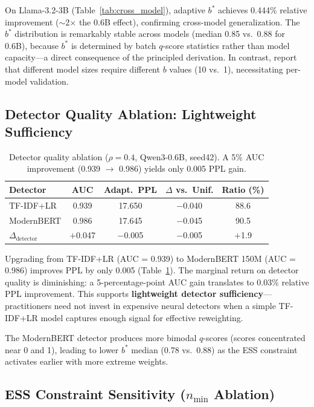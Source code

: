 \documentclass[11pt,a4paper]{article}
\newcommand{\bstar}{b^{*}}
\newcommand{\nmin}{n_{\min}}
\begin{document}
On Llama-3.2-3B (Table~\ref{tab:cross_model}), adaptive $\bstar$ achieves 0.444\% relative improvement ($\sim$2$\times$ the 0.6B effect), confirming cross-model generalization.
The $\bstar$ distribution is remarkably stable across models (median 0.85 vs.\ 0.88 for 0.6B), because $\bstar$ is determined by batch $q$-score statistics rather than model capacity---a direct consequence of the principled derivation.
In contrast, \citet{drayson2025} report that different model sizes require different $b$ values (10 vs.\ 1), necessitating per-model validation.

\subsection{Detector Quality Ablation: Lightweight Sufficiency}
\label{sec:detector_ablation}

\begin{table}[t]
\centering
\small
\caption{Detector quality ablation ($\rho{=}0.4$, Qwen3-0.6B, seed42). A 5\% AUC improvement (0.939 $\to$ 0.986) yields only 0.005 PPL gain.}
\label{tab:detector_ablation}
\begin{tabular}{lcccc}
\toprule
Detector & AUC & Adapt.\ PPL & $\Delta$ vs.\ Unif. & Ratio (\%) \\
\midrule
TF-IDF+LR & 0.939 & 17.650 & $-$0.040 & 88.6 \\
ModernBERT & 0.986 & 17.645 & $-$0.045 & 90.5 \\
\midrule
$\Delta_{\text{detector}}$ & $+$0.047 & $-$0.005 & $-$0.005 & $+$1.9 \\
\bottomrule
\end{tabular}
\end{table}

Upgrading from TF-IDF+LR (AUC = 0.939) to ModernBERT 150M (AUC = 0.986) improves PPL by only 0.005 (Table~\ref{tab:detector_ablation}).
The marginal return on detector quality is diminishing: a 5-percentage-point AUC gain translates to 0.03\% relative PPL improvement.
This supports \textbf{lightweight detector sufficiency}---practitioners need not invest in expensive neural detectors when a simple TF-IDF+LR model captures enough signal for effective reweighting.

The ModernBERT detector produces more bimodal $q$-scores (scores concentrated near 0 and 1), leading to lower $\bstar$ median (0.78 vs.\ 0.88) as the ESS constraint activates earlier with more extreme weights.

\subsection{ESS Constraint Sensitivity ($\nmin$ Ablation)}
\label{sec:nmin_ablation}
\end{document}
